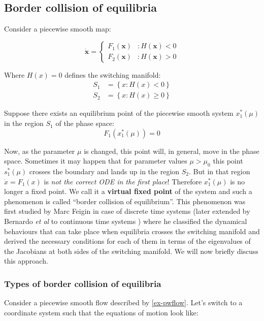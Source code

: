\documentclass{book}
\renewcommand{\(}{\begin{columns}}
\renewcommand{\)}{\end{columns}}
\newcommand{\<}[1]{\begin{column}{#1}}
\renewcommand{\>}{\end{column}}
\newcommand{\bb}[1]{\textbf{#1}}
\begin{document}
\subsection{Border collision of equilibria}
Consider a piecewise smooth map:

\begin{equation}
\label{ex-pwflow}
   \dot{\mathbf{x}} = \left\{
     \begin{array}{lr}
       F_1(\mathbf{x}) & : H(\mathbf{x})<0\\
       F_2(\mathbf{x}) & : H(\mathbf{x})>0
     \end{array}
   \right.
\end{equation}

Where $H(x)=0$ defines the switching manifold:
\begin{align*}
S_1&=\left\{x:H(x)<0\right\}\\
S_2&=\left\{x:H(x)\geq0\right\}
\end{align*}

Suppose there exists an equilibrium point of the 
piecewise smooth system $x_1^*(\mu)$ in the region $S_1$ of the phase space:
\[
F_1(x_1^*(\mu))=0
\]


Now, as the parameter $\mu$ is changed, this point will, in general, move in the phase 
space.  Sometimes it may happen that for parameter values $\mu>\mu_0$ this point $s_1^*(\mu)$ crosses the 
boundary and lands up in the region $S_2$.  But in that region $\dot{x}=F_1(x)$ 
is \emph{not the correct ODE in the first place}! Therefore $x_1^*(\mu)$ is no longer 
a fixed point.  We call it a \bb{virtual fixed point}  of the system and such a phenomenon is called 
``border collision of equilibrium''. This phenomenon was first studied by Marc 
Feigin in case of discrete time systems \cite{feigin-1999}(later extended by 
Bernardo \emph{et al} to continuous time systems \cite{bernardo-c-cases}) where he classified the dynamical 
behaviours that can take place when equilibria crosses the switching manifold and 
 derived the necessary conditions for each of them in
terms of the eigenvalues of the Jacobians at both sides of the switching 
manifold. We will now briefly discuss this approach.  

\subsubsection{Types of border collision of equilibria}
Consider a piecewise smooth flow described by \eqref{ex-pwflow}. Let's switch 
to a coordinate system such that the equations of motion look like:
\end{document}
